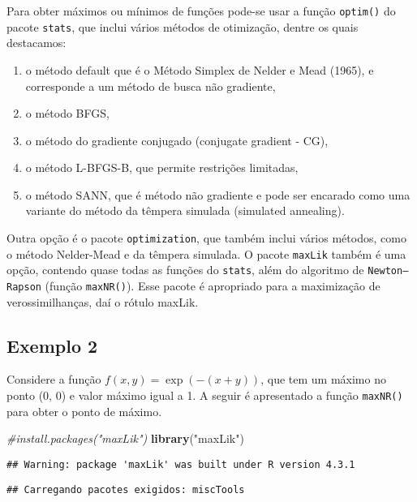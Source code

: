 \documentclass[
]{article}
\newenvironment{Shaded}{\begin{snugshade}}{\end{snugshade}}
\newcommand{\CommentTok}[1]{\textcolor[rgb]{0.56,0.35,0.01}{\textit{#1}}}
\newcommand{\FunctionTok}[1]{\textcolor[rgb]{0.13,0.29,0.53}{\textbf{#1}}}
\newcommand{\NormalTok}[1]{#1}
\newcommand{\StringTok}[1]{\textcolor[rgb]{0.31,0.60,0.02}{#1}}
\begin{document}
Para obter máximos ou mínimos de funções pode-se usar a função
\texttt{optim()} do pacote \texttt{stats}, que inclui vários métodos de
otimização, dentre os quais destacamos:

\begin{enumerate}
\def\labelenumi{\roman{enumi})}
\item
  o método default que é o Método Simplex de Nelder e Mead (1965), e
  corresponde a um método de busca não gradiente,
\item
  o método BFGS,
\item
  o método do gradiente conjugado (conjugate gradient - CG),
\item
  o método L-BFGS-B, que permite restrições limitadas,
\item
  o método SANN, que é método não gradiente e pode ser encarado como uma
  variante do método da têmpera simulada (simulated annealing).
\end{enumerate}

Outra opção é o pacote \texttt{optimization}, que também inclui vários
métodos, como o método Nelder-Mead e da têmpera simulada. O pacote
\texttt{maxLik} também é uma opção, contendo quase todas as funções do
\texttt{stats}, além do algoritmo de \texttt{Newton–Rapson} (função
\texttt{maxNR()}). Esse pacote é apropriado para a maximização de
verossimilhanças, daí o rótulo maxLik.

\hypertarget{exemplo-2}{%
\subsection{Exemplo 2}\label{exemplo-2}}

Considere a função \(f(x,y)=\exp(-(x+ y))\), que tem um máximo no ponto
(0, 0) e valor máximo igual a 1. A seguir é apresentado a função
\texttt{maxNR()} para obter o ponto de máximo.

\begin{Shaded}
\begin{Highlighting}[]
\CommentTok{\#install.packages("maxLik")}
\FunctionTok{library}\NormalTok{(}\StringTok{"maxLik"}\NormalTok{)}
\end{Highlighting}
\end{Shaded}

\begin{verbatim}
## Warning: package 'maxLik' was built under R version 4.3.1
\end{verbatim}

\begin{verbatim}
## Carregando pacotes exigidos: miscTools
\end{verbatim}
\end{document}
